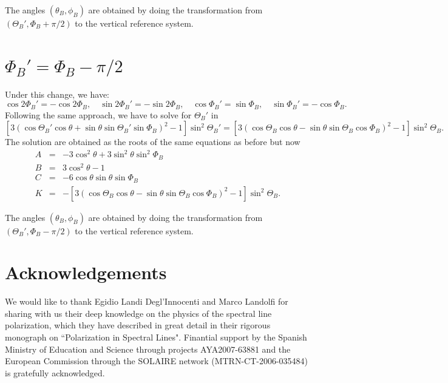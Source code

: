 \documentclass[12pt]{article}
\begin{document}
The angles $(\theta_B,\phi_B)$ are obtained by doing the transformation from $(\Theta_B',\Phi_B+\pi/2)$ to the
vertical reference system.


\section{$\Phi_B' = \Phi_B-\pi/2$}
Under this change, we have:
\begin{equation}
\cos 2\Phi_B' = -\cos 2\Phi_B, \quad \sin 2\Phi_B' = -\sin 2\Phi_B, \quad \cos \Phi_B' = \sin \Phi_B, \quad \sin \Phi_B' = -\cos \Phi_B.
\end{equation}
Following the same approach, we have to solve for $\Theta_B'$ in 
\begin{equation}
\left[ 3 \left( \cos \Theta_B' \cos \theta + \sin\theta \sin\Theta_B' \sin\Phi_B\right)^2-1 \right] \sin^2 \Theta_B' = 
\left[ 3 \left( \cos \Theta_B \cos \theta - \sin\theta \sin\Theta_B \cos\Phi_B\right)^2-1 \right] \sin^2 \Theta_B.
\end{equation}
The solution are obtained as the roots of the same equations as before but now
\begin{eqnarray}
A &=& -3\cos^2 \theta + 3\sin^2 \theta \sin^2 \Phi_B \nonumber \\
B &=& 3\cos^2 \theta - 1 \nonumber \\
C &=& -6 \cos\theta \sin\theta \sin \Phi_B \nonumber \\
K &=& -\left[ 3 \left( \cos \Theta_B \cos \theta - \sin\theta \sin\Theta_B \cos\Phi_B\right)^2-1 \right] \sin^2 \Theta_B.
\end{eqnarray}

The angles $(\theta_B,\phi_B)$ are obtained by doing the transformation from $(\Theta_B',\Phi_B-\pi/2)$ to the
vertical reference system.


\section*{Acknowledgements}
We would like to thank Egidio Landi Degl'Innocenti and Marco Landolfi
for sharing with us their deep knowledge on the physics of the spectral line polarization,
which they have described in great detail in their
rigorous monograph on ``Polarization in Spectral Lines". Finantial support by 
the Spanish Ministry of Education and Science through projects AYA2007-63881 and 
the European Commission through the SOLAIRE network (MTRN-CT-2006-035484) is gratefully acknowledged.



% 
\end{document}
